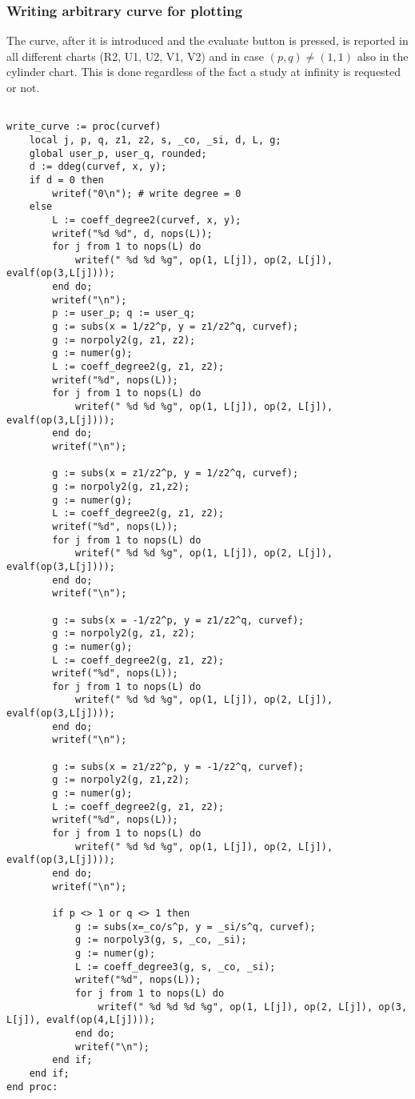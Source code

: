 \documentclass[a4paper,10pt]{article}
\begin{document}
\subsubsection{Writing arbitrary curve for plotting}

The curve, after it is introduced and the evaluate button is pressed, is reported in all different charts (R2, U1, U2, V1, V2) and in case $(p,q)\not=(1,1)$ also in the cylinder chart.  This is done regardless of the fact a study at infinity is requested or not.

\begin{lstlisting}[name=writelog2]

write_curve := proc(curvef)
    local j, p, q, z1, z2, s, _co, _si, d, L, g;
    global user_p, user_q, rounded;
    d := ddeg(curvef, x, y);
    if d = 0 then
        writef("0\n"); # write degree = 0
    else
        L := coeff_degree2(curvef, x, y);
        writef("%d %d", d, nops(L));
        for j from 1 to nops(L) do
            writef(" %d %d %g", op(1, L[j]), op(2, L[j]), evalf(op(3,L[j])));
        end do;
        writef("\n");
        p := user_p; q := user_q;
        g := subs(x = 1/z2^p, y = z1/z2^q, curvef);
        g := norpoly2(g, z1, z2);
        g := numer(g);
        L := coeff_degree2(g, z1, z2);
        writef("%d", nops(L));
        for j from 1 to nops(L) do
            writef(" %d %d %g", op(1, L[j]), op(2, L[j]), evalf(op(3,L[j])));
        end do;
        writef("\n");

        g := subs(x = z1/z2^p, y = 1/z2^q, curvef);
        g := norpoly2(g, z1,z2);
        g := numer(g);
        L := coeff_degree2(g, z1, z2);
        writef("%d", nops(L));
        for j from 1 to nops(L) do
            writef(" %d %d %g", op(1, L[j]), op(2, L[j]), evalf(op(3,L[j])));
        end do;
        writef("\n");

        g := subs(x = -1/z2^p, y = z1/z2^q, curvef);
        g := norpoly2(g, z1, z2);
        g := numer(g);
        L := coeff_degree2(g, z1, z2);
        writef("%d", nops(L));
        for j from 1 to nops(L) do
            writef(" %d %d %g", op(1, L[j]), op(2, L[j]), evalf(op(3,L[j])));
        end do;
        writef("\n");

        g := subs(x = z1/z2^p, y = -1/z2^q, curvef);
        g := norpoly2(g, z1,z2);
        g := numer(g);
        L := coeff_degree2(g, z1, z2);
        writef("%d", nops(L));
        for j from 1 to nops(L) do
            writef(" %d %d %g", op(1, L[j]), op(2, L[j]), evalf(op(3,L[j])));
        end do;
        writef("\n");

        if p <> 1 or q <> 1 then
            g := subs(x=_co/s^p, y = _si/s^q, curvef);
            g := norpoly3(g, s, _co, _si);
            g := numer(g);
            L := coeff_degree3(g, s, _co, _si);
            writef("%d", nops(L));
            for j from 1 to nops(L) do
                writef(" %d %d %d %g", op(1, L[j]), op(2, L[j]), op(3, L[j]), evalf(op(4,L[j])));
            end do;
            writef("\n");
        end if;
    end if;
end proc:
\end{lstlisting}
\end{document}
